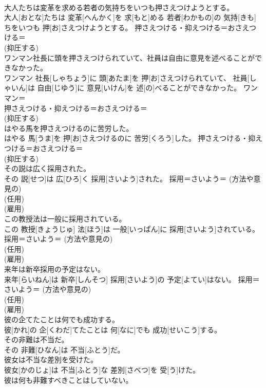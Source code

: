 \documentclass[8pt]{extreport}
\begin{document}
\begin{CJK}{UTF8}{min}
{\\	大人たちは変革を求める若者の気持ちをいつも押さえつけようとする。	
\\	大人[おとな]たちは 変革[へんかく]を 求[もと]める 若者[わかもの]の 気持[きも]ちをいつも 押[お]さえつけようとする。	押さえつける・抑えつける＝おさえつける＝ 
\\	(抑圧する) 
\\	ワンマン社長に頭を押さえつけられていて、社員は自由に意見を述べることができなかった。	
\\	ワンマン 社長[しゃちょう]に 頭[あたま]を 押[お]さえつけられていて、 社員[しゃいん]は 自由[じゆう]に 意見[いけん]を 述[の]べることができなかった。	ワンマン＝ 
\\	押さえつける・抑えつける＝おさえつける＝ 
\\	(抑圧する) 
\\	はやる馬を押さえつけるのに苦労した。	
\\	はやる 馬[うま]を 押[お]さえつけるのに 苦労[くろう]した。	押さえつける・抑えつける＝おさえつける＝ 
\\	(抑圧する) 
\\	その説は広く採用された。	
\\	その 説[せつ]は 広[ひろ]く 採用[さいよう]された。	採用＝さいよう＝ (方法や意見の) 
\\	(任用) 
\\	(雇用) 
\\	この教授法は一般に採用されている。	
\\	この 教授[きょうじゅ] 法[ほう]は 一般[いっぱん]に 採用[さいよう]されている。	採用＝さいよう＝ (方法や意見の) 
\\	(任用) 
\\	(雇用) 
\\	来年は新卒採用の予定はない。	
\\	来年[らいねん]は 新卒[しんそつ] 採用[さいよう]の 予定[よてい]はない。	採用＝さいよう＝ (方法や意見の) 
\\	(任用) 
\\	(雇用) 
\\	彼の企てたことは何でも成功する。	
\\	彼[かれ]の 企[くわだ]てたことは 何[なに]でも 成功[せいこう]する。	
\\	その非難は不当だ。	
\\	その 非難[ひなん]は 不当[ふとう]だ。	
\\	彼女は不当な差別を受けた。	
\\	彼女[かのじょ]は 不当[ふとう]な 差別[さべつ]を 受[う]けた。	
\\	彼は何も非難すべきことはしていない。	
}
\end{CJK}
\end{document}
